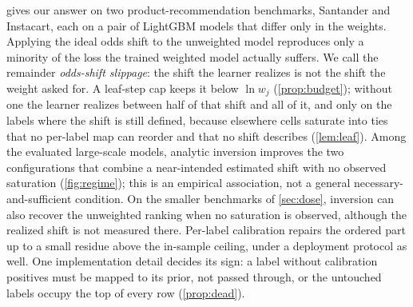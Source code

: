 \documentclass[sigconf,nonacm]{acmart}
\begin{document}
 gives our answer on two product-recommendation benchmarks, Santander and Instacart, each on a pair of LightGBM models that differ only in the weights. Applying the ideal odds shift to the unweighted model reproduces only a minority of the loss the trained weighted model actually suffers. We call the remainder \emph{odds-shift slippage}: the shift the learner realizes is not the shift the weight asked for. A leaf-step cap keeps it below $\ln w_j$ (\cref{prop:budget}); without one the learner realizes between half of that shift and all of it, and only on the labels where the shift is still defined, because elsewhere cells saturate into ties that no per-label map can reorder and that no shift describes (\cref{lem:leaf}). Among the evaluated large-scale models, analytic inversion improves the two configurations that combine a near-intended estimated shift with no observed saturation (\cref{fig:regime}); this is an empirical association, not a general necessary-and-sufficient condition. On the smaller benchmarks of \cref{sec:dose}, inversion can also recover the unweighted ranking when no saturation is observed, although the realized shift is not measured there. Per-label calibration repairs the ordered part up to a small residue above the in-sample ceiling, under a deployment protocol as well. One implementation detail decides its sign: a label without calibration positives must be mapped to its prior, not passed through, or the untouched labels occupy the top of every row (\cref{prop:dead}).
\end{document}
